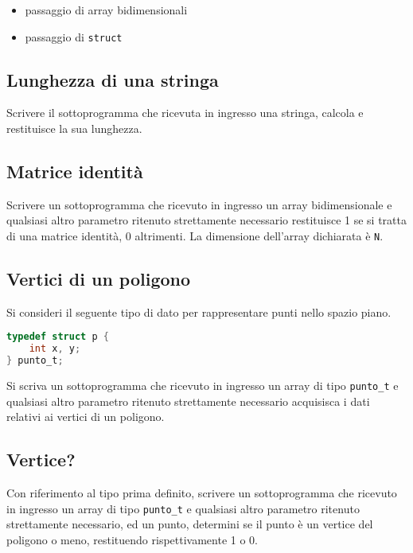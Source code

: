\begin{itemize}
\item passaggio di array bidimensionali
\item passaggio di \texttt{struct}
\end{itemize}


\subsection{Lunghezza di una stringa}
Scrivere il sottoprogramma che ricevuta in ingresso una stringa, calcola e
restituisce la sua lunghezza.


\subsection{Matrice identit\`a}
Scrivere un sottoprogramma che ricevuto in ingresso un array bidimensionale e qualsiasi altro parametro ritenuto strettamente necessario restituisce 1 se si tratta di una matrice identit\`a, 0 altrimenti. La dimensione dell'array dichiarata \`e \texttt{N}.


\subsection{Vertici di un poligono}
Si consideri il seguente tipo di dato per rappresentare punti nello spazio piano.
\begin{lstlisting}[language=c]
typedef struct p {
    int x, y;
} punto_t;
\end{lstlisting}

Si scriva un sottoprogramma che ricevuto in ingresso un array di tipo \texttt{punto\_t} e qualsiasi altro parametro ritenuto strettamente necessario acquisisca i dati relativi ai vertici di un poligono.


\subsection{Vertice?}
Con riferimento al tipo prima definito, scrivere un sottoprogramma che ricevuto in ingresso un array di tipo \texttt{punto\_t} e qualsiasi altro parametro ritenuto strettamente necessario, ed un punto, determini se il punto \`e un vertice del poligono o meno, restituendo rispettivamente 1 o 0.

